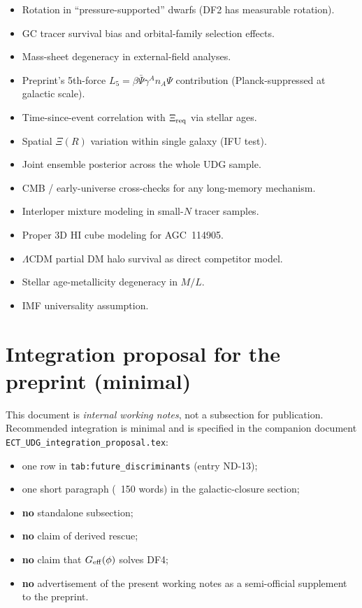 \documentclass[11pt]{article}
\begin{document}
\begin{itemize}
\item Rotation in ``pressure-supported'' dwarfs (DF2 has measurable rotation).
\item GC tracer survival bias and orbital-family selection effects.
\item Mass-sheet degeneracy in external-field analyses.
\item Preprint's 5th-force $L_5=\beta\bar\Psi\gamma^A n_A\Psi$
contribution (Planck-suppressed at galactic scale).
\item Time-since-event correlation with $\Xi_{\rm req}$ via stellar
ages.
\item Spatial $\Xi(R)$ variation within single galaxy (IFU test).
\item Joint ensemble posterior across the whole UDG sample.
\item CMB / early-universe cross-checks for any long-memory mechanism.
\item Interloper mixture modeling in small-$N$ tracer samples.
\item Proper 3D HI cube modeling for AGC~114905.
\item $\Lambda$CDM partial DM halo survival as direct competitor model.
\item Stellar age-metallicity degeneracy in $M/L$.
\item IMF universality assumption.
\end{itemize}

\section{Integration proposal for the preprint (minimal)}

This document is \emph{internal working notes}, not a subsection for
publication. Recommended integration is minimal and is specified in
the companion document {\tt ECT\_UDG\_integration\_proposal.tex}:
\begin{itemize}
\item one row in {\tt tab:future\_discriminants} (entry ND-13);
\item one short paragraph (~150 words) in the galactic-closure
section;
\item \textbf{no} standalone subsection;
\item \textbf{no} claim of derived rescue;
\item \textbf{no} claim that $G_{\rm eff}(\phi)$ solves DF4;
\item \textbf{no} advertisement of the present working notes as a
semi-official supplement to the preprint.
\end{itemize}
\end{document}
